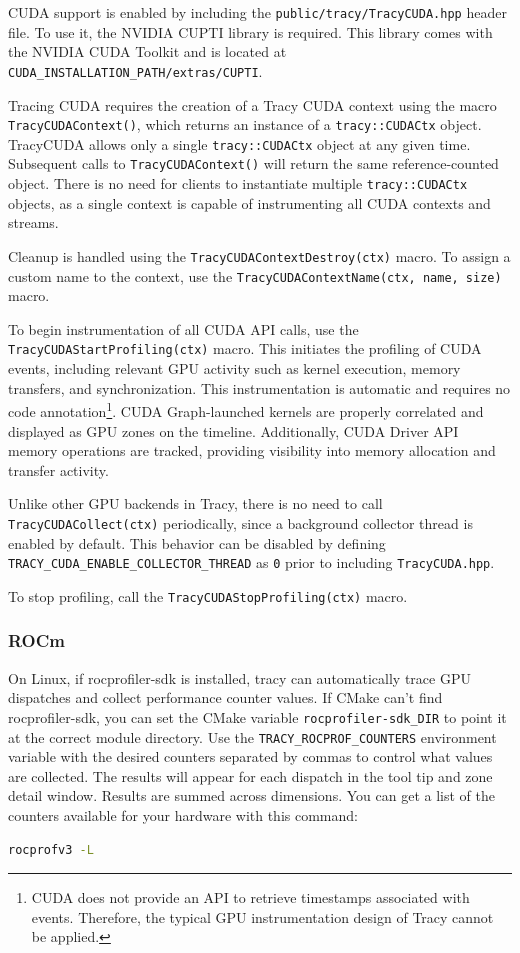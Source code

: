 \documentclass[hidelinks,titlepage,a4paper,twoside]{article}
\begin{document}
CUDA support is enabled by including the \texttt{public/tracy/TracyCUDA.hpp} header file. To use it, the NVIDIA CUPTI library is required. This library comes with the NVIDIA CUDA Toolkit and is located at \texttt{CUDA\_INSTALLATION\_PATH/extras/CUPTI}.

Tracing CUDA requires the creation of a Tracy CUDA context using the macro \texttt{TracyCUDAContext()}, which returns an instance of a \texttt{tracy::CUDACtx} object. TracyCUDA allows only a single \texttt{tracy::CUDACtx} object at any given time. Subsequent calls to \texttt{TracyCUDAContext()} will return the same reference-counted object. There is no need for clients to instantiate multiple \texttt{tracy::CUDACtx} objects, as a single context is capable of instrumenting all CUDA contexts and streams.

Cleanup is handled using the \texttt{TracyCUDAContextDestroy(ctx)} macro. To assign a custom name to the context, use the \texttt{TracyCUDAContextName(ctx, name, size)} macro.

To begin instrumentation of all CUDA API calls, use the \texttt{TracyCUDAStartProfiling(ctx)} macro. This initiates the profiling of CUDA events, including relevant GPU activity such as kernel execution, memory transfers, and synchronization. This instrumentation is automatic and requires no code annotation\footnote{CUDA does not provide an API to retrieve timestamps associated with events. Therefore, the typical GPU instrumentation design of Tracy cannot be applied.}. CUDA Graph-launched kernels are properly correlated and displayed as GPU zones on the timeline. Additionally, CUDA Driver API memory operations are tracked, providing visibility into memory allocation and transfer activity.

Unlike other GPU backends in Tracy, there is no need to call \texttt{TracyCUDACollect(ctx)} periodically, since a background collector thread is enabled by default. This behavior can be disabled by defining \texttt{TRACY\_CUDA\_ENABLE\_COLLECTOR\_THREAD} as \texttt{0} prior to including \texttt{TracyCUDA.hpp}.

To stop profiling, call the \texttt{TracyCUDAStopProfiling(ctx)} macro.

\subsubsection{ROCm}

On Linux, if rocprofiler-sdk is installed, tracy can automatically trace GPU dispatches and collect
performance counter values. If CMake can't find rocprofiler-sdk, you can set the CMake variable
\texttt{rocprofiler-sdk\_DIR} to point it at the correct module directory. Use the
\texttt{TRACY\_ROCPROF\_COUNTERS} environment variable with the desired counters separated by commas
to control what values are collected. The results will appear for each dispatch in the tool tip and
zone detail window. Results are summed across dimensions. You can get a list of the counters
available for your hardware with this command:
\begin{lstlisting}[language=sh]
rocprofv3 -L
\end{lstlisting}
\end{document}

